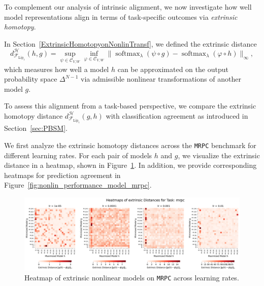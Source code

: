 To complement our analysis of intrinsic alignment, we now investigate how well model representations align in terms of task-specific outcomes via \emph{extrinsic homotopy}.

In Section~\ref{ExtrinsicHomotopyonNonlinTransf}, we defined the extrinsic distance
\[
d_{\mathcal{F}_{\mathrm{Lip}_1}}^{\mathcal{H}}(h, g) = \sup_{\psi \in \mathcal{C}_{V,W}} \inf_{\varphi \in \mathcal{C}_{V,W}} \| \operatorname{softmax}_\lambda ( \psi \circ g) - \operatorname{softmax}_\lambda( \varphi \circ h )\|_\infty,
\]
which measures how well a model $h$ can be approximated on the output probability space $\Delta^{N-1}$ via admissible nonlinear transformations of another model $g$.

To assess this alignment from a task-based perspective, we compare the extrinsic homotopy distance \( d_{\mathcal{F}_{\mathrm{Lip}_1}}^{\mathcal{H}}(g, h) \) with classification agreement as introduced in Section~\ref{sec:PBSM}.

We first analyze the extrinsic homotopy distances across the \texttt{MRPC} benchmark for different learning rates.  
For each pair of models \( h \) and \( g \), we visualize the extrinsic distance in a heatmap, shown in Figure~\ref{fig:nonlin_intrinsic_model_mrpc}.  
In addition, we provide corresponding heatmaps for prediction agreement in Figure~\ref{fig:nonlin_performance_model_mrpc}.

\begin{figure}[H]
    \centering
    \includegraphics[width=\linewidth]{Abschlussarbeit/Pictures/heatmaps_smaller_circles/Heatmap_extrinsic_distance_all_lrs_mrpc_homotopy.png}
    \caption{Heatmap of extrinsic nonlinear models on \texttt{MRPC} across learning rates.}
    \label{fig:nonlin_intrinsic_model_mrpc}
\end{figure}

